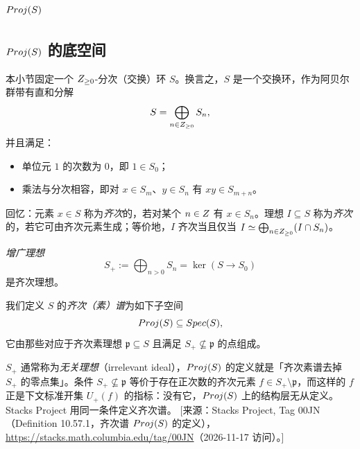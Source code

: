 
\section{$Proj(S)$}\label{sec:25}

\subsection{$Proj(S)$ 的底空间}\label{sec:25.1}

本小节固定一个 $Z_{\ge 0}$-分次（交换）环 $S$。换言之，$S$ 是一个交换环，作为阿贝尔群带有直和分解
\[
S = \bigoplus_{n \in Z_{\ge 0}} S_n,
\]
并且满足：
\begin{itemize}[leftmargin=2em,itemsep=0.25ex]
  \item 单位元 $1$ 的次数为 $0$，即 $1 \in S_0$；
  \item 乘法与分次相容，即对 $x \in S_m$、$y \in S_n$ 有 $xy \in S_{m+n}$。
\end{itemize}

回忆：元素 $x \in S$ 称为\emph{齐次}的，若对某个 $n \in Z$ 有 $x \in S_n$。理想 $I \subseteq S$ 称为\emph{齐次}的，若它可由齐次元素生成；等价地，$I$ 齐次当且仅当 $I \simeq \bigoplus_{n \in Z_{\ge 0}} (I \cap S_n)$。

\begin{example}\label{ex:25.1.1}
\emph{增广理想}
\[
S_+ := \bigoplus_{n>0} S_n = \ker(S \to S_0)
\]
是齐次理想。
\end{example}

\begin{definition}\label{def:25.1.2}
我们定义 $S$ 的\emph{齐次（素）谱}为如下子空间
\[
Proj(S) \subseteq Spec(S),
\]
它由那些对应于齐次素理想 $\mathfrak p \subseteq S$ 且满足 $S_+ \not\subseteq \mathfrak p$ 的点组成。
\end{definition}

\begin{yizhu}
$S_+$ 通常称为\emph{无关理想}（irrelevant ideal），$Proj(S)$ 的定义就是「齐次素谱去掉 $S_+$ 的零点集」。条件 $S_+ \not\subseteq \mathfrak p$ 等价于存在正次数的齐次元素 $f \in S_+ \setminus \mathfrak p$，而这样的 $f$ 正是下文标准开集 $U_+(f)$ 的指标：没有它，$Proj(S)$ 上的结构层无从定义。Stacks Project 用同一条件定义齐次谱。
[来源：Stacks Project, Tag 00JN（Definition 10.57.1，齐次谱 $Proj(S)$ 的定义），\url{https://stacks.math.columbia.edu/tag/00JN}（2026-11-17 访问）。]
\end{yizhu}

